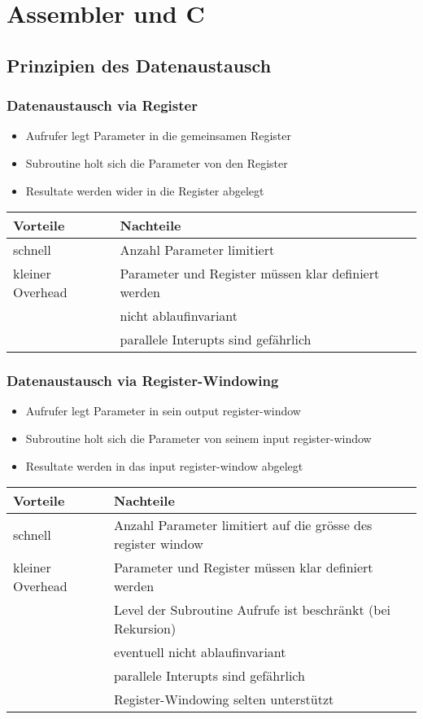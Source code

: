 \section{Assembler und C}
\subsection{Prinzipien des Datenaustausch}

\subsubsection{Datenaustausch via Register}
\begin{itemize}
  \item Aufrufer legt Parameter in die gemeinsamen Register
  \item Subroutine holt sich die Parameter von den Register
  \item Resultate werden wider in die Register abgelegt
\end{itemize}
\begin{tabular}{p{}|l}
	\textbf{Vorteile} 	& \textbf{Nachteile} \\
	\hline
	schnell				& Anzahl Parameter limitiert \\
	kleiner Overhead	& Parameter und Register müssen klar definiert werden \\
						& nicht ablaufinvariant \\ 
						& parallele Interupts sind gefährlich
\end{tabular}


\subsubsection{Datenaustausch via Register-Windowing}
\begin{itemize}
  \item Aufrufer legt Parameter in sein output register-window
  \item Subroutine holt sich die Parameter von seinem input register-window
  \item Resultate werden in das input register-window abgelegt
\end{itemize}
\begin{tabular}{p{}|l}
	\textbf{Vorteile} 	& \textbf{Nachteile} \\
	\hline
	schnell				& Anzahl Parameter limitiert auf die grösse des register window \\
	kleiner Overhead	& Parameter und Register müssen klar definiert werden \\
						& Level der Subroutine Aufrufe ist beschränkt (bei Rekursion) \\
						& eventuell nicht ablaufinvariant \\ 
						& parallele Interupts sind gefährlich \\
						& Register-Windowing selten unterstützt
\end{tabular}


